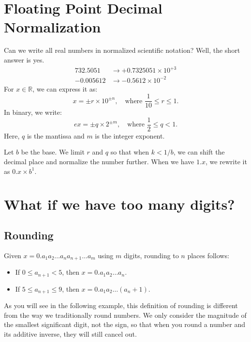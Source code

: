 \section{Floating Point Decimal Normalization}

Can we write all real numbers in normalized scientific notation? Well, the short
answer is yes.
\begin{align*}
    732.5051 &\rightarrow +0.7325051 \times 10^{+3} \\
    -0.005612 &\rightarrow -0.5612 \times 10^{-2}
\end{align*}
For $x \in \mathbb{R}$, we can express it as:
\begin{equation*}
    x = \pm r \times 10^{\pm n}, \quad \text{where } \frac{1}{10} \leq r \leq 1.
\end{equation*}
In binary, we write:
\begin{equation*}
  e x = \pm q \times 2^{\pm m}, \quad \text{where } \frac{1}{2} \leq q < 1.
\end{equation*}
Here, $q$ is the mantissa and $m$ is the integer exponent.

Let $b$ be the base.
We limit $r$ and $q$ so that when $k < 1/b$, we can shift the decimal 
place and normalize the number further. When we have $1.x$, we rewrite it 
as $0.x \times b^1$.

\section{What if we have too many digits?}
\subsection{Rounding}
Given $x = 0.a_1 a_2 \dots a_n a_{n+1} \dots a_m$ using $m$ digits, rounding 
to $n$ places follows:
\begin{itemize}
    \item If $0 \leq a_{n+1} < 5$, then $x = 0.a_1 a_2 \dots a_n$.
    \item If $5 \leq a_{n+1} \leq 9$, then $x = 0.a_1 a_2 \dots (a_n + 1)$.
\end{itemize}
As you will see in the following example, this definition of rounding is
different from the way we traditionally round numbers. We only consider the
magnitude of the smallest significant digit, not the sign, so that when you
round a number and its additive inverse, they will still cancel out.

